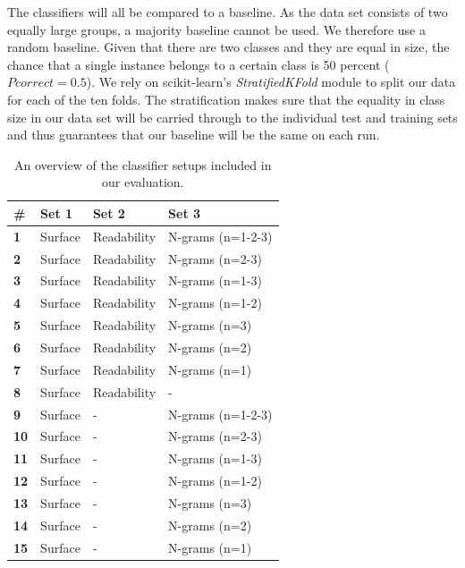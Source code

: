 \documentclass[
10pt, %
a4paper, %
oneside, %
headinclude,footinclude, %
] {book}%
\begin{document}
The classifiers will all be compared to a baseline. As the data set consists of two equally large groups, a majority baseline cannot be used. We therefore use a random baseline. Given that there are two classes and they are equal in size, the chance that a single instance belongs to a certain class is 50 percent ($Pcorrect = 0.5$). We rely on scikit-learn's \textit{StratifiedKFold} module to split our data for each of the ten folds. The stratification makes sure that the equality in class size in our data set will be carried through to the individual test and training sets and thus guarantees that our baseline will be the same on each run.

\begin{table}[]
\caption{An overview of the classifier setups included in our evaluation.}
\centering
\begin{tabular}{llll}
\hline
\#          & \textbf{Set 1} & \textbf{Set 2} & \textbf{Set 3}    \\ \hline
\textbf{1}  & Surface        & Readability    & N-grams (n=1-2-3) \\
\textbf{2}  & Surface        & Readability    & N-grams (n=2-3)   \\
\textbf{3}  & Surface        & Readability    & N-grams (n=1-3)   \\
\textbf{4}  & Surface        & Readability    & N-grams (n=1-2)   \\
\textbf{5}  & Surface        & Readability    & N-grams (n=3)     \\
\textbf{6}  & Surface        & Readability    & N-grams (n=2)     \\
\textbf{7}  & Surface        & Readability    & N-grams (n=1)     \\
\textbf{8}  & Surface        & Readability    & -                 \\
\textbf{9}  & Surface        & -              & N-grams (n=1-2-3) \\
\textbf{10} & Surface        & -                & N-grams (n=2-3)   \\
\textbf{11} & Surface        & -              & N-grams (n=1-3)   \\
\textbf{12} & Surface        & -              & N-grams (n=1-2)   \\
\textbf{13} & Surface        & -              & N-grams (n=3)     \\
\textbf{14} & Surface        & -              & N-grams (n=2)     \\
\textbf{15} & Surface        & -              & N-grams (n=1)     \\

\end{tabular}
\end{table}
\end{document}
